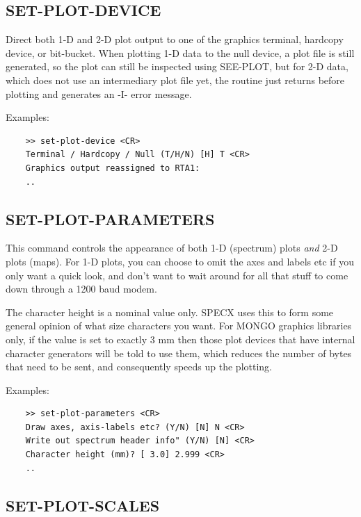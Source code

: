 \documentclass[11pt,twoside]{report}
\begin{document}
\subsection{SET-PLOT-DEVICE} 

Direct both 1-D and 2-D plot output to one of the graphics terminal,
hardcopy device, or bit-bucket.
When plotting 1-D data to the null device,
a plot file is still
generated, so the plot can still
be inspected using SEE-PLOT, but
for 2-D data, which does not use an
intermediary plot file yet, the routine just returns before plotting
and generates an -I- error message.

Examples:
\begin{verbatim}
    >> set-plot-device <CR>
    Terminal / Hardcopy / Null (T/H/N) [H] T <CR>
    Graphics output reassigned to RTA1:
    ..
\end{verbatim}

\subsection{SET-PLOT-PARAMETERS} 

This command controls the appearance of both 1-D (spectrum) plots {\em and} 2-D
plots (maps). For 1-D plots, you can choose to omit the axes and labels etc if
 you only want a quick look, and don't want
to wait around for all that stuff to come down through a 1200 baud modem.

The character height  is a nominal value
only. SPECX uses this to form some general opinion of what size characters you
want. For MONGO graphics libraries only, if the value is set to exactly 3 mm
then those plot devices that have internal character generators will be told to
use them, which reduces the number of bytes that need to be sent, and
consequently speeds up the plotting.

Examples:
\begin{verbatim}
    >> set-plot-parameters <CR>
    Draw axes, axis-labels etc? (Y/N) [N] N <CR>
    Write out spectrum header info" (Y/N) [N] <CR>
    Character height (mm)? [ 3.0] 2.999 <CR>
    ..
\end{verbatim}

\subsection{SET-PLOT-SCALES} 
\end{document}
